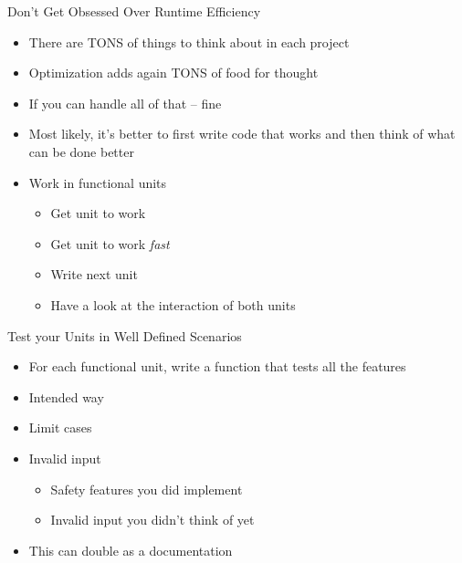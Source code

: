 
\begin{frame}{Don't Get Obsessed Over Runtime Efficiency}
%
\begin{itemize}
\item There are TONS of things to think about in each project
\item Optimization adds again TONS of food for thought
\item If you can handle all of that -- fine
\item Most likely, it's better to first write code that works and then think of what can be done better
\item Work in functional units
	\begin{itemize}
	\item Get unit to work
	\item Get unit to work \emph{fast}
	\item Write next unit
	\item Have a look at the interaction of both units
	\end{itemize}
\end{itemize}
%
\end{frame}


\begin{frame}{Test your Units in Well Defined Scenarios}
%
\begin{itemize}
\item For each functional unit, write a function that tests all the features
\item Intended way
\item Limit cases
\item Invalid input
	\begin{itemize}
	\item Safety features you did implement
	\item Invalid input you didn't think of yet
	\end{itemize}
\item This can double as a documentation
\end{itemize}
%
\end{frame}


